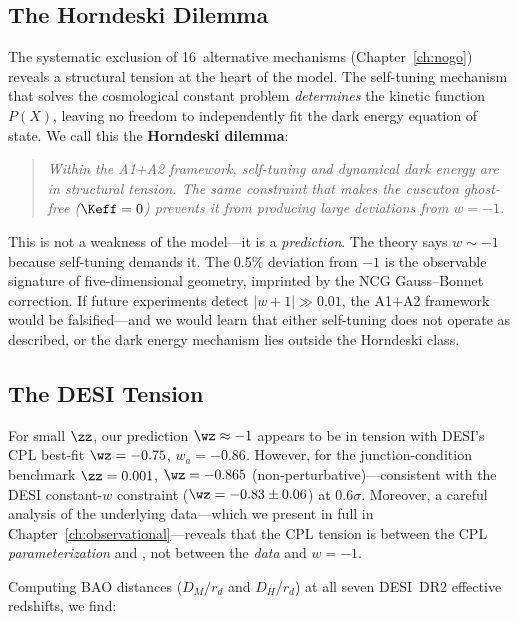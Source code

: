 \subsection{The Horndeski Dilemma}
\label{sec:1-horndeski-dilemma}

The systematic exclusion of 16~alternative mechanisms (Chapter~\ref{ch:nogo}) reveals a structural tension at the heart of the model. The self-tuning mechanism that solves the cosmological constant problem \emph{determines} the kinetic function $P(X)$, leaving no freedom to independently fit the dark energy equation of state. We call this the \textbf{Horndeski dilemma}:

\begin{quote}
\itshape Within the A1+A2 framework, self-tuning and dynamical dark energy are in structural tension. The same constraint that makes the cuscuton ghost-free ($\Keff = 0$) prevents it from producing large deviations from $w = -1$.
\end{quote}

This is not a weakness of the model---it is a \emph{prediction}. The theory says $w \sim -1$ because self-tuning demands it. The 0.5\% deviation from $-1$ is the observable signature of five-dimensional geometry, imprinted by the NCG Gauss--Bonnet correction. If future experiments detect $|w + 1| \gg 0.01$, the A1+A2 framework would be falsified---and we would learn that either self-tuning does not operate as described, or the dark energy mechanism lies outside the Horndeski class.

\subsection{The DESI Tension}
\label{sec:1-desi-tension}

For small $\zz$, our prediction $\wz \approx -1$ appears to be in tension with DESI's CPL best-fit $\wz = -0.75$, $w_a = -0.86$. However, for the junction-condition benchmark $\zz = 0.001$, $\wz = -0.865$ (non-perturbative)---consistent with the DESI constant-$w$ constraint ($\wz = -0.83 \pm 0.06$) at $0.6\sigma$. Moreover, a careful analysis of the underlying data---which we present in full in Chapter~\ref{ch:observational}---reveals that the CPL tension is between the CPL \emph{parameterization} and \LCDM, not between the \emph{data} and $w = -1$.

Computing BAO distances ($D_M/r_d$ and $D_H/r_d$) at all seven DESI~DR2 effective redshifts, we find:

